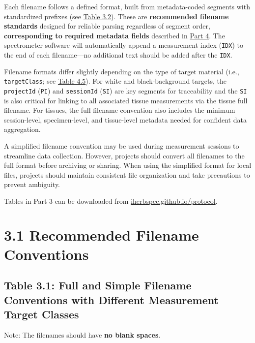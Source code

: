 \documentclass[
  letterpaper,
  DIV=11,
  numbers=noendperiod]{scrreprt}
\begin{document}
Each filename follows a defined format, built from metadata-coded
segments with standardized prefixes (see \hyperref[tbl-3-2]{Table 3.2}).
These are \textbf{recommended filename standards} designed for reliable
parsing regardless of segment order, \textbf{corresponding to required
metadata fields} described in \href{part4-metadata.qmd}{Part 4}. The
spectrometer software will automatically append a measurement index
(\texttt{IDX}) to the end of each filename---no additional text should
be added after the \texttt{IDX}.

Filename formats differ slightly depending on the type of target
material (i.e., \texttt{targetClass}; see \hyperref[tbl-4-5]{Table
4.5}). For white and black-background targets, the \texttt{projectId}
(\texttt{PI}) and \texttt{sessionId} (\texttt{SI}) are key segments for
traceability and the \texttt{SI} is also critical for linking to all
associated tissue measurements via the tissue full filename. For
tissues, the full filename convention also includes the minimum
session-level, specimen-level, and tissue-level metadata needed for
confident data aggregation.

A simplified filename convention may be used during measurement sessions
to streamline data collection. However, projects should convert all
filenames to the full format before archiving or sharing. When using the
simplified format for local files, projects should maintain consistent
file organization and take precautions to prevent ambiguity.

Tables in Part 3 can be downloaded from
\href{https://iherbspec.github.io/protocol}{iherbspec.github.io/protocol}.

\section{3.1 Recommended Filename
Conventions}\label{recommended-filename-conventions}

\subsection{Table 3.1: Full and Simple Filename Conventions with
Different Measurement Target Classes}\label{tbl-3-1}

Note: The filenames should have \textbf{no blank spaces}.
\end{document}
